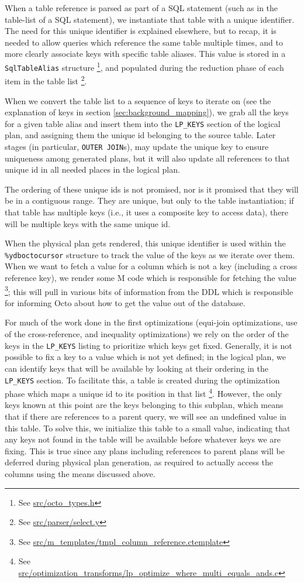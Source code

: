 \documentclass[]{article}
\def\code#1{\texttt{#1}}
\newcommand{\gitlab}[1]{\footnote{See \href{https://gitlab.com/YottaDB/DBMS/YDBOcto/blob/master/#1}{#1}}}
\begin{document}
When a table reference is parsed as part of a SQL statement (such as in the table-list of a SQL statement), we instantiate that table with a unique identifier.
The need for this unique identifier is explained elsewhere, but to recap, it is needed to allow queries which reference the same table multiple times, and to more clearly associate keys with specific table aliases.
This value is stored in a \code{SqlTableAlias} structure \gitlab{src/octo\_types.h}, and populated during the reduction phase of each item in the table list \gitlab{src/parser/select.y}.

When we convert the table list to a sequence of keys to iterate on (see the explanation of keys in section \ref{sec:background_mapping}), we grab all the keys for a given table alias and insert them into the \code{LP\_KEYS} section of the logical plan, and assigning them the unique id belonging to the source table.
Later stages (in particular, \code{OUTER JOIN}s), may update the unique key to ensure uniqueness among generated plans, but it will also update all references to that unique id in all needed places in the logical plan.

The ordering of these unique ids is not promised, nor is it promised that they will be in a contiguous range.
They are unique, but only to the table instantiation; if that table has multiple keys (i.e., it uses a composite key to access data), there will be multiple keys with the same unique id.

When the physical plan gets rendered, this unique identifier is used within the \code{\%ydboctocursor} structure to track the value of the keys as we iterate over them.
When we want to fetch a value for a column which is not a key (including a cross reference key), we render some M code which is responsible for fetching the value \gitlab{src/m\_templates/tmpl\_column\_reference.ctemplate}; this will pull in various bits of information from the DDL which is responsible for informing Octo about how to get the value out of the database.

For much of the work done in the first optimizations (equi-join optimizations, use of the cross-reference, and inequality optimizations) we rely on the order of the keys in the \code{LP\_KEYS} listing to prioritize which keys get fixed.
Generally, it is not possible to fix a key to a value which is not yet defined; in the logical plan, we can identify keys that will be available by looking at their ordering in the \code{LP\_KEYS} section.
To facilitate this, a table is created during the optimization phase which maps a unique id to its position in that list \gitlab{src/optimization\_transforms/lp\_optimize\_where\_multi\_equals\_ands.c}.
However, the only keys known at this point are the keys belonging to this subplan, which means that if there are references to a parent query, we will see an undefined value in this table.
To solve this, we initialize this table to a small value, indicating that any keys not found in the table will be available before whatever keys we are fixing.
This is true since any plans including references to parent plans will be deferred during physical plan generation, as required to actually access the columns using the means discussed above.
\end{document}
